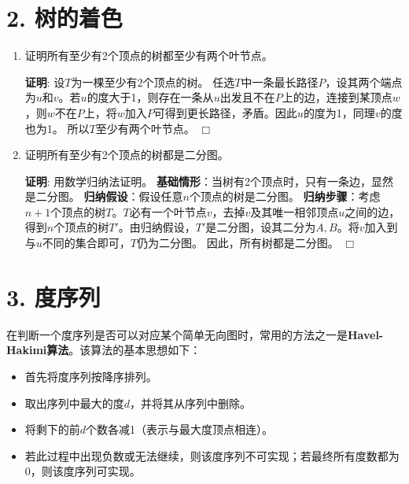 \documentclass[11pt]{article}
\newenvironment{qparts}{\begin{enumerate}[{(}a{)}]}{\end{enumerate}}
\def\endproofmark{$\Box$}
\newenvironment{proof}{\par{\bf 证明}:}{\endproofmark\smallskip}
\begin{document}
\section*{2. 树的着色}

\begin{qparts}
\item 证明所有至少有2个顶点的树都至少有两个叶节点。

\begin{proof}
设$T$为一棵至少有2个顶点的树。\newline
任选$T$中一条最长路径$P$，设其两个端点为$u$和$v$。若$u$的度大于1，则存在一条从$u$出发且不在$P$上的边，连接到某顶点$w$，则$w$不在$P$上，将$w$加入$P$可得到更长路径，矛盾。因此$u$的度为1，同理$v$的度也为1。\newline
所以$T$至少有两个叶节点。
\end{proof}

\item 证明所有至少有2个顶点的树都是二分图。

\begin{proof}
用数学归纳法证明。\newline
\textbf{基础情形}：当树有2个顶点时，只有一条边，显然是二分图。\newline
\textbf{归纳假设}：假设任意$n$个顶点的树是二分图。\newline
\textbf{归纳步骤}：考虑$n+1$个顶点的树$T$。$T$必有一个叶节点$v$，去掉$v$及其唯一相邻顶点$u$之间的边，得到$n$个顶点的树$T'$。由归纳假设，$T'$是二分图，设其二分为$A,B$。将$v$加入到与$u$不同的集合即可，$T$仍为二分图。\newline
因此，所有树都是二分图。
\end{proof}
\end{qparts}

\section*{3. 度序列}

在判断一个度序列是否可以对应某个简单无向图时，常用的方法之一是\textbf{Havel-Hakimi算法}。该算法的基本思想如下：

\begin{itemize}
  \item 首先将度序列按降序排列。
  \item 取出序列中最大的度$d$，并将其从序列中删除。
  \item 将剩下的前$d$个数各减1（表示与最大度顶点相连）。
  \item 若此过程中出现负数或无法继续，则该度序列不可实现；若最终所有度数都为0，则该度序列可实现。
\end{itemize}
\end{document}
